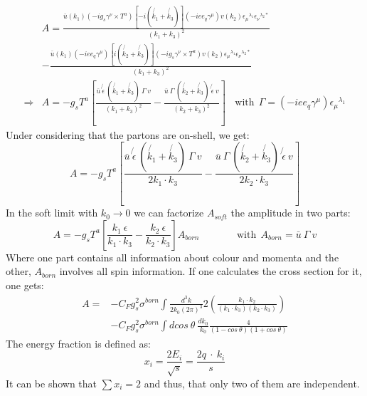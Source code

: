 \begin{equation}
\begin{split}
&A= \frac{\bar{u}(k_1)(-ig_s\gamma^{\nu}\times T^a)[-i(\not{k_1}+\not{k_3})](-iee_q \gamma^{\mu})v(k_2){\epsilon_{\mu}}^{\lambda_1}{\epsilon_{\nu}}^{\lambda_2*}}{(k_1 + k_3)^2}\\ 
&- \frac{\bar{u}(k_1)(-iee_q \gamma^{\mu})[i(\not{k_2}+\not{k_3})](-ig_s\gamma^{\nu}\times T^a)v(k_2){\epsilon_{\mu}}^{\lambda_1}{\epsilon_{\nu}}^{\lambda_2*}}{(k_1 + k_3)^2}\\
\Rightarrow &A=-g_s T^a[ \frac{\bar{u}\:\not{\epsilon}\:(\not{k_1}+\not{k_3})\:\Gamma \:v}{(k_1 + k_3)^2} - \frac{\bar{u}\:\Gamma\:(\not{k_2}+\not{k_3})\:\not{\epsilon} \:v}{(k_2 + k_3)^2}] \:\:\:\:\text{with} \:\:\Gamma=(-iee_q \gamma^{\mu}){\epsilon_{\mu}}^{\lambda_1}
\end{split}
\end{equation}
Under considering that the partons are on-shell, we get:
\begin{equation}
 A=-g_s T^a[ \frac{\bar{u}\:\not{\epsilon}\:(\not{k_1}+\not{k_3})\:\Gamma \:v}{2k_1 \cdot k_3} - \frac{\bar{u}\:\Gamma\:(\not{k_2}+\not{k_3})\:\not{\epsilon} \:v}{2k_2 \cdot k_3}]
\end{equation}
In the soft limit with $k_0 \rightarrow 0$ we can factorize $ A_{soft} $ the amplitude in two parts:
\begin{equation}
 A=-g_s T^a[ \frac{k_1\:{\epsilon}}{k_1 \cdot k_3} - \frac{k_2\:{\epsilon}}{k_2 \cdot k_3}] A_{born} \:\:\:\:\:\:\:\:\:\:\:\:\:\:\:\:\:\text{with}\:\: A_{born}= \bar{u}\: \Gamma \:v
\end{equation}
 Where one part contains all information about colour and momenta and the other, $ A_{born} $ involves all spin information.
If one calculates the cross section for it, one gets:
\begin{equation}
\begin{split}
A=&-C_F g_s^2 \sigma^{born} \int \frac{d^3 k}{2k_0 (2{\pi})^3} 2(\frac{k_1 \cdot k_2}{(k_1 \cdot k_3)(k_2 \cdot k_3)})\\ 
&-C_F g_s^2 \sigma^{born} \int dcos\: \theta\: \frac{d k_0}{k_0} \frac{4}{(1-cos\: \theta)(1+cos\: \theta)}
\end{split}
\end{equation}
The energy fraction is defined as:
\begin{equation}
x_i = \frac{2E_i}{\sqrt{s}}=\frac{2q\: \cdot\: k_i}{s}
\end{equation}
It can be shown that $ \sum x_i =2  $ and thus, that only two of them are independent.


